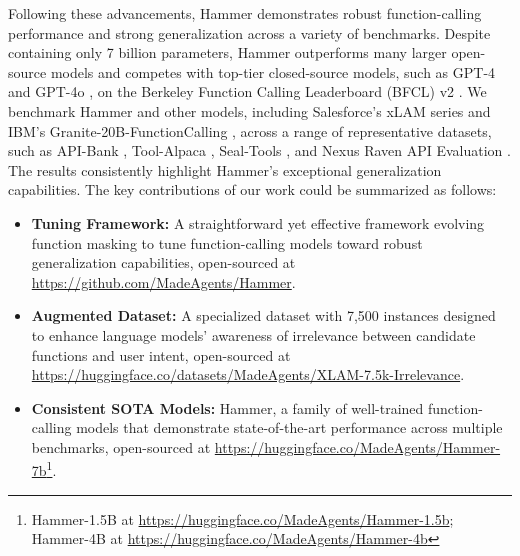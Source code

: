 \documentclass{article}
\begin{document}
Following these advancements, Hammer demonstrates robust function-calling performance and strong generalization across a variety of benchmarks. Despite containing only 7 billion parameters, Hammer outperforms many larger open-source models and competes with top-tier closed-source models, such as GPT-4 \citep{achiam2023gpt} and GPT-4o \citep{islam2024gpt}, on the Berkeley Function Calling Leaderboard (BFCL) v2 \citep{berkeley-function-calling-leaderboard}. We benchmark Hammer and other models, including Salesforce's xLAM series \citep{zhang2024xlamfamilylargeaction} and IBM's Granite-20B-FunctionCalling \citep{abdelaziz2024granite}, across a range of representative datasets, such as API-Bank \citep{li2023apibankcomprehensivebenchmarktoolaugmented}, Tool-Alpaca \citep{tang2023toolalpaca}, Seal-Tools \citep{wu2024sealtoolsselfinstructtoollearning}, and Nexus Raven API Evaluation \citep{srinivasan2023nexusraven}. The results consistently highlight Hammer's exceptional generalization capabilities. The key contributions of our work could be summarized as follows:
\begin{itemize}
    \item \textbf{Tuning Framework:} A straightforward yet effective framework evolving function masking to tune function-calling models toward robust generalization capabilities, open-sourced at \url{https://github.com/MadeAgents/Hammer}.
    \item \textbf{Augmented Dataset:} A specialized dataset with 7,500 instances designed to enhance language models' awareness of irrelevance between candidate functions and user intent, open-sourced at \url{https://huggingface.co/datasets/MadeAgents/XLAM-7.5k-Irrelevance}.
    \item \textbf{Consistent SOTA Models:} Hammer, a family of well-trained function-calling models that demonstrate state-of-the-art performance across multiple benchmarks, open-sourced at \url{https://huggingface.co/MadeAgents/Hammer-7b}\footnote{Hammer-1.5B at \url{https://huggingface.co/MadeAgents/Hammer-1.5b}; Hammer-4B at \url{https://huggingface.co/MadeAgents/Hammer-4b}}.
\end{itemize}
\end{document}
